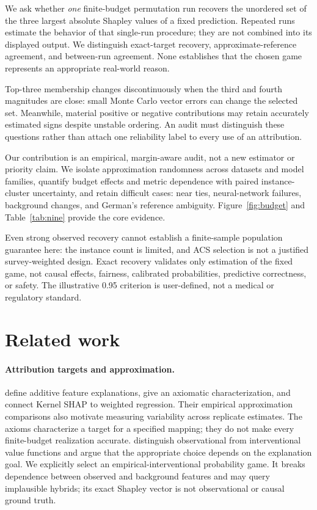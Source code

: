 \documentclass{article}
\begin{document}
We ask whether \emph{one} finite-budget permutation run recovers the unordered set of the three largest absolute Shapley values of a fixed prediction. Repeated runs estimate the behavior of that single-run procedure; they are not combined into its displayed output. We distinguish exact-target recovery, approximate-reference agreement, and between-run agreement. None establishes that the chosen game represents an appropriate real-world reason.

Top-three membership changes discontinuously when the third and fourth magnitudes are close: small Monte Carlo vector errors can change the selected set. Meanwhile, material positive or negative contributions may retain accurately estimated signs despite unstable ordering. An audit must distinguish these questions rather than attach one reliability label to every use of an attribution.

Our contribution is an empirical, margin-aware audit, not a new estimator or priority claim. We isolate approximation randomness across datasets and model families, quantify budget effects and metric dependence with paired instance-cluster uncertainty, and retain difficult cases: near ties, neural-network failures, background changes, and German's reference ambiguity. Figure~\ref{fig:budget} and Table~\ref{tab:nine} provide the core evidence.

Even strong observed recovery cannot establish a finite-sample population guarantee here: the instance count is limited, and ACS selection is not a justified survey-weighted design. Exact recovery validates only estimation of the fixed game, not causal effects, fairness, calibrated probabilities, predictive correctness, or safety. The illustrative 0.95 criterion is user-defined, not a medical or regulatory standard.

\section{Related work}
\paragraph{Attribution targets and approximation.}
\citet{lundberg2017shap} define additive feature explanations, give an axiomatic characterization, and connect Kernel SHAP to weighted regression. Their empirical approximation comparisons also motivate measuring variability across replicate estimates. The axioms characterize a target for a specified mapping; they do not make every finite-budget realization accurate. \citet{chen2020true} distinguish observational from interventional value functions and argue that the appropriate choice depends on the explanation goal. We explicitly select an empirical-interventional probability game. It breaks dependence between observed and background features and may query implausible hybrids; its exact Shapley vector is not observational or causal ground truth.
\end{document}
